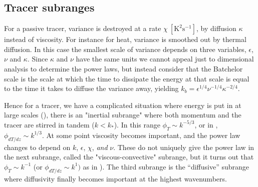 \documentclass[11pt]{article}
\begin{document}
\subsection{Tracer subranges}

For a passive tracer, variance is destroyed at a rate $\chi\ \mathrm{[K^2
s^{-1}]}$, by diffusion $\kappa$ instead of viscosity.  For instance for heat,
variance is smoothed out by thermal diffusion.  In this case the smallest scale
of variance depends on three variables, $\epsilon$, $\nu$ and $\kappa$.  Since
$\kappa$ and $\nu$ have the same units we cannot appeal just to dimensional
analysis to determine the power laws, but instead consider that the Batchelor
scale is the scale at which the time to dissipate the energy at that scale is
equal to the time it takes to diffuse the variance away, yielding $k_b =
\epsilon^{1/4}\nu^{-1/4}\kappa^{-2/4}$.  

Hence for a tracer, we have a complicated situation where energy is put in at
large scales (), there is an  "inertial
subrange" where both momentum and the tracer are stirred in tandem ($k<k_*$).
In this range $\phi_T\sim k^{-5/3}$, or in ,
$\phi_ {dT/dz} \sim k^{1/3}$.   At some point viscosity becomes important, and
the power law changes to depend on $k$, $\epsilon$, $\chi$, \emph{and} $\nu$. 
These do not uniquely give the power law in the next subrange, called the
"viscous-convective" subrange, but it turns out that $\phi_T\sim k^{-1}$ (or
$\phi_ {dT/dz} \sim k^{1})$ as in ).  The third
subrange is the ``diffusive'' subrange where diffusivity finally becomes
important at the highest wavenumbers.  
\end{document}
